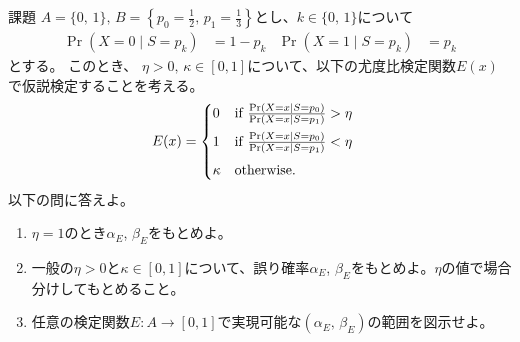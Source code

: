 \documentclass[lualatex,handout]{beamer}
\theoremstyle{definition}
\begin{document}
\begin{frame}{課題}
\small
$A=\{0,\,1\},\, B=\left\{p_0=\frac12,\,p_1=\frac13\right\}$とし、$k\in\{0,\,1\}$について
\begin{align*}
\Pr(X = 0 \mid S = p_k) &= 1-p_k&
\Pr(X = 1 \mid S = p_k) &= p_k
\end{align*}
とする。
このとき、 $\eta> 0,\,\kappa\in[0,1]$について、以下の尤度比検定関数$E(x)$で仮説検定することを考える。
\begin{align*}
E(x)&=
\begin{cases}
\vspace{.5em}
0&\text{if } \frac{\Pr(X = x\mid S = p_0)}{\Pr(X = x\mid S = p_1)} > \eta\\\vspace{.5em}
1&\text{if } \frac{\Pr(X = x\mid S = p_0)}{\Pr(X = x\mid S = p_1)} < \eta\\
\kappa&\text{otherwise.}
\end{cases}
\end{align*}
以下の問に答えよ。
\begin{enumerate}
\setlength{\itemsep}{1em}
\item $\eta=1$のとき$\alpha_E$, $\beta_E$をもとめよ。
\item 一般の$\eta>0$と$\kappa\in[0,1]$について、誤り確率$\alpha_E$, $\beta_E$をもとめよ。$\eta$の値で場合分けしてもとめること。
\item 任意の検定関数$E\colon A\to[0,1]$で実現可能な$(\alpha_E,\, \beta_E)$の範囲を図示せよ。
\end{enumerate}
\end{frame}
\end{document}
